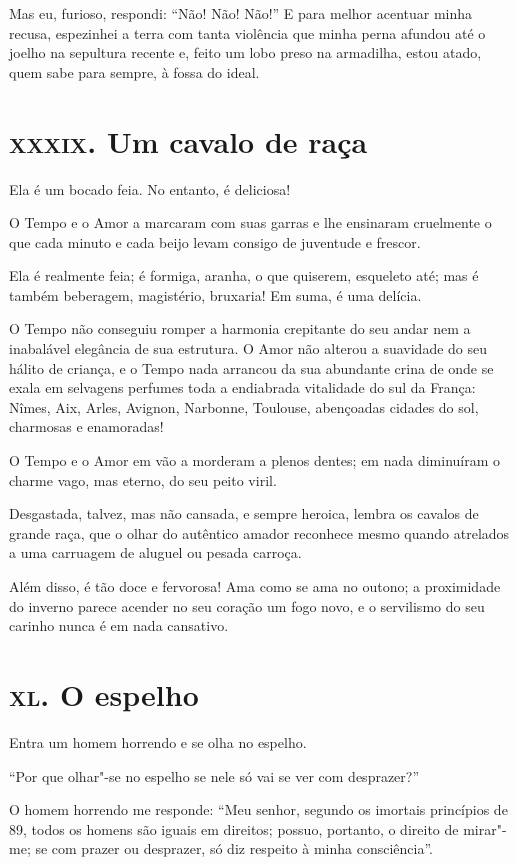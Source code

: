 Mas eu, furioso, respondi: “Não! Não! Não!''
E para melhor acentuar minha recusa, espezinhei a
terra com tanta violência que minha perna afundou até o joelho na sepultura recente e, feito
um lobo preso na armadilha, estou atado, quem sabe para sempre, à fossa
do ideal.

\chapter{\textsc{xxxix.} Um cavalo de raça}

Ela é um bocado feia. No entanto, é deliciosa!

O Tempo e o Amor a marcaram com suas garras e lhe ensinaram cruelmente o
que cada minuto e cada beijo levam consigo de juventude e frescor.

Ela é realmente feia; é formiga, aranha, o que quiserem, esqueleto até;
mas é também beberagem, magistério, bruxaria! Em suma, é uma delícia.

O Tempo não conseguiu romper a harmonia crepitante do seu andar nem a
inabalável elegância de sua estrutura. O Amor não alterou a suavidade
do seu hálito de criança, e o Tempo nada arrancou da sua abundante
crina de onde se exala em selvagens perfumes toda a
endiabrada vitalidade do sul da França: Nîmes, Aix, Arles, Avignon, Narbonne,
Toulouse, abençoadas cidades do sol, charmosas e enamoradas!

O Tempo e o Amor em vão a morderam a plenos dentes; em nada
diminuíram o charme vago, mas eterno, do seu peito viril.

Desgastada, talvez, mas não cansada, e sempre heroica, lembra os cavalos
de grande raça, que o olhar do autêntico amador reconhece mesmo quando
atrelados a uma carruagem de aluguel ou pesada carroça.

Além disso, é tão doce e fervorosa! Ama como se ama no outono;
a proximidade do inverno parece acender no seu coração um
fogo novo, e o servilismo do seu carinho nunca é em nada cansativo.

\chapter{\textsc{xl.} O espelho}

Entra um homem horrendo e se olha no espelho.

“Por que olhar"-se no espelho se nele só vai se
ver com desprazer?''

O homem horrendo me responde: “Meu senhor, segundo os imortais
princípios de 89, todos os homens são iguais em direitos; possuo,
portanto, o direito de mirar"-me; se com prazer ou desprazer, só diz
respeito à minha consciência''.

